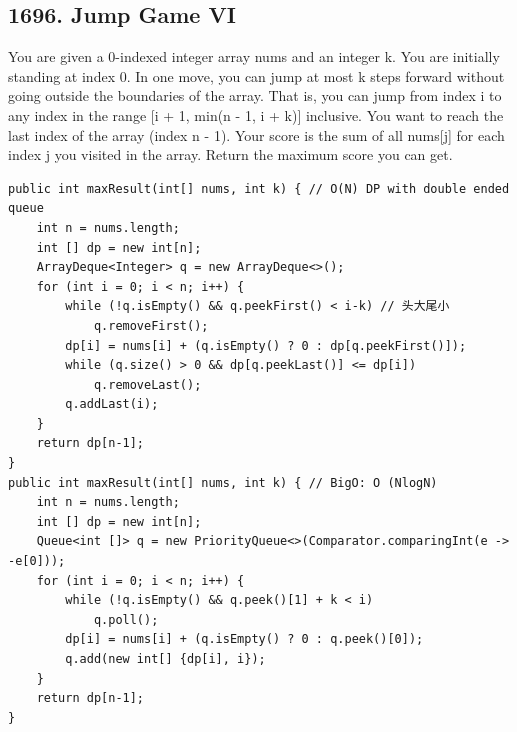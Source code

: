 \documentclass[9pt, b5paper]{article}
\begin{document}
\subsection{1696. Jump Game VI}
\label{sec-8-2}
You are given a 0-indexed integer array nums and an integer k.
You are initially standing at index 0. In one move, you can jump at most k steps forward without going outside the boundaries of the array. That is, you can jump from index i to any index in the range [i + 1, min(n - 1, i + k)] inclusive.
You want to reach the last index of the array (index n - 1). Your score is the sum of all nums[j] for each index j you visited in the array.
Return the maximum score you can get.
\begin{verbatim}
public int maxResult(int[] nums, int k) { // O(N) DP with double ended queue
    int n = nums.length;
    int [] dp = new int[n];
    ArrayDeque<Integer> q = new ArrayDeque<>();
    for (int i = 0; i < n; i++) {
        while (!q.isEmpty() && q.peekFirst() < i-k) // 头大尾小
            q.removeFirst();
        dp[i] = nums[i] + (q.isEmpty() ? 0 : dp[q.peekFirst()]);
        while (q.size() > 0 && dp[q.peekLast()] <= dp[i])
            q.removeLast();
        q.addLast(i);
    }
    return dp[n-1];
}
public int maxResult(int[] nums, int k) { // BigO: O (NlogN)
    int n = nums.length;
    int [] dp = new int[n];
    Queue<int []> q = new PriorityQueue<>(Comparator.comparingInt(e -> -e[0]));
    for (int i = 0; i < n; i++) {
        while (!q.isEmpty() && q.peek()[1] + k < i)
            q.poll();
        dp[i] = nums[i] + (q.isEmpty() ? 0 : q.peek()[0]);
        q.add(new int[] {dp[i], i});
    }
    return dp[n-1];
}
\end{verbatim}
\end{document}

